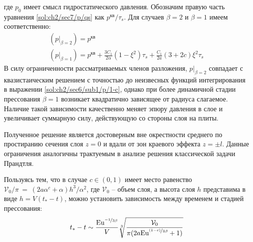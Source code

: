 \endgroup
где $p_0$ имеет смысл гидростатического давления. Обозначим правую часть уравнения \cref{sol:ch2/sec7/p/qs} как $p^\text{кв} / \tau_{s}$. Для случаев $\beta=2$ и $\beta=1$ имеем соответственно:
\begin{gather}
  \left(p\lvert_{\beta=2}\right) = p^\text{кв}
  \\
  \left(p\lvert_{\beta=1}\right) = p^\text{кв} + \frac{3C_1}{2\alpha} \left(1-\xi^2\right) \tau_{s} + \frac{C_1}{2a}\left(3+2c\right)\xi^2 \tau_{s}
\end{gather}
В силу ограниченности рассматриваемых членов разложения, $p\lvert_{\beta=2}$ совпадает с квазистаическим решением с точностью до неизвесных функций интегрирования в выражении \cref{sol:ch2/sec6/sub1/p/1-c}, однако при более динамичной стадии прессования $\beta=1$ возникает квадратично зависящее от радиуса слагаемое. Наличие такой зависимости качественно меняет эпюру давления в слое и увеличивает суммарную силу, действующую со стороны слоя на плиты.

Полученное решение является достоверным вне окрестности среднего по простиранию сечения слоя $z=0$ и вдали от зон краевого эффекта $z=\pm l$. Данные ограничения аналогичны трактуемым в анализе решения классической задачи Прандтля.

Пользуясь тем, что в случае $c\in\left(0,1\right)$ имеет место равенство $\mathcal{V}_0 / \pi~=~\left(2a \alpha^{c} + \alpha\right) h^{3} / \alpha^{2}$, где $\mathcal{V}_0$ -- объем слоя, а высота слоя $h$ представима в виде $h=V \left(t_*-t\right)$, можно установить зависимость между временем и стадией прессования:
\begin{equation}
  t_* - t \sim \frac{\text{Eu}^{\nicefrac{-1}{3\beta}}}{V}\sqrt[3]{\frac{\mathcal{V}_0}{\pi(2a\text{Eu}^{\nicefrac{(1-c)}{3\beta}}+1)}}
\end{equation}
